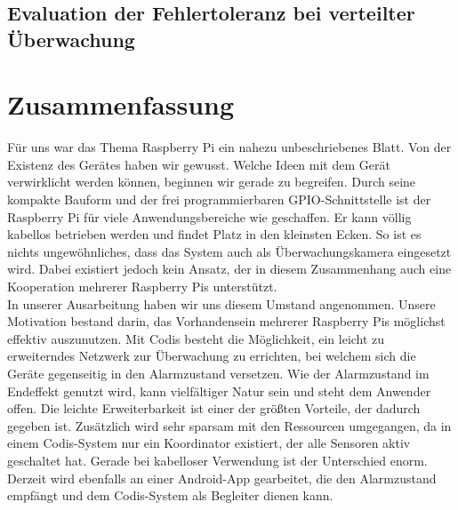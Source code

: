 \documentclass[journal]{IEEEtran}
\begin{document}
\subsection{Evaluation der Fehlertoleranz bei verteilter Überwachung}



\section{Zusammenfassung}
Für uns war das Thema Raspberry Pi ein nahezu unbeschriebenes Blatt. Von der Existenz des Gerätes haben wir gewusst. Welche Ideen mit dem Gerät verwirklicht werden können, beginnen wir gerade zu begreifen. Durch seine kompakte Bauform und der frei programmierbaren GPIO-Schnittstelle ist der Raspberry Pi für viele Anwendungsbereiche wie geschaffen. Er kann völlig kabellos betrieben werden und findet Platz in den kleinsten Ecken. So ist es nichts ungewöhnliches, dass das System auch als Überwachungskamera eingesetzt wird. Dabei existiert jedoch kein Ansatz, der in diesem Zusammenhang auch eine Kooperation mehrerer Raspberry Pis unterstützt. \\In unserer Ausarbeitung haben wir uns diesem Umstand angenommen. Unsere Motivation bestand darin, das Vorhandensein mehrerer Raspberry Pis möglichst effektiv auszunutzen. Mit Codis besteht die Möglichkeit, ein leicht zu erweiterndes Netzwerk zur Überwachung zu errichten, bei welchem sich die Geräte gegenseitig in den Alarmzustand versetzen. Wie der Alarmzustand im Endeffekt genutzt wird, kann vielfältiger Natur sein und steht dem Anwender offen. Die leichte Erweiterbarkeit ist einer der größten Vorteile, der dadurch gegeben ist. Zusätzlich wird sehr sparsam mit den Ressourcen umgegangen, da in einem Codis-System nur ein Koordinator existiert, der alle Sensoren aktiv geschaltet hat. Gerade bei kabelloser Verwendung ist der Unterschied enorm. Derzeit wird ebenfalls an einer Android-App gearbeitet, die den Alarmzustand empfängt und dem Codis-System als Begleiter dienen kann.



\printbibliography
\end{document}
